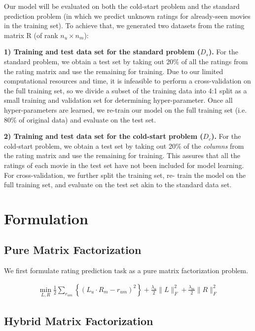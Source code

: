 \documentclass{article} %
\begin{document}
	Our model will be evaluated on both the cold-start problem and the standard
	prediction problem (in which we predict unknown ratings for already-seen
	movies in the training set). To achieve that, we generated two datasets from the
	rating matrix R (of rank $n_u \times n_m$):

	\textbf{1) Training and test data set for the standard problem ($D_s$).}
	For the standard problem, we obtain a test set by taking out 20\% of all the
	ratings from the rating matrix and use the remaining for training.
	Due to our limited computational resources and time, it is infeasible to
	perform a cross-validation on the full training set, so we divide a subset
	of the training data into 4:1 split as a small training and validation set
	for determining hyper-parameter.  Once all hyper-parameters are learned, we
	re-train our model on the full training set (i.e. 80\% of original data) and
	evaluate on the test set.

  \textbf{2) Training and test data set for the cold-start problem ($D_c$).}
For the cold-start problem, we obtain a test set by taking out 20\% of   the
{\em columns} from the rating matrix and use the remaining for training. This
assures that all the ratings of each movie in the test set have not been
included for model learning.   For cross-validation, we further split the
training set, re- train the model on the full training set, and evaluate on
the test set akin to the standard data set.


\section{Formulation}

	\subsection{Pure Matrix Factorization}

	We first formulate rating prediction task as a pure matrix factorization problem.

	\begin{align}
	\min_{L, R} \frac{1}{2}\sum_{r_{um}} \left\{(L_u \cdot R_m - r_{um})^2\right\}
		+ \frac{\lambda_u}{2}\|L\|^2_F + \frac{\lambda_m}{2}\|R\|^2_F \label{eq:mf}
	\end{align}



	\subsection{Hybrid Matrix Factorization}
\end{document}
